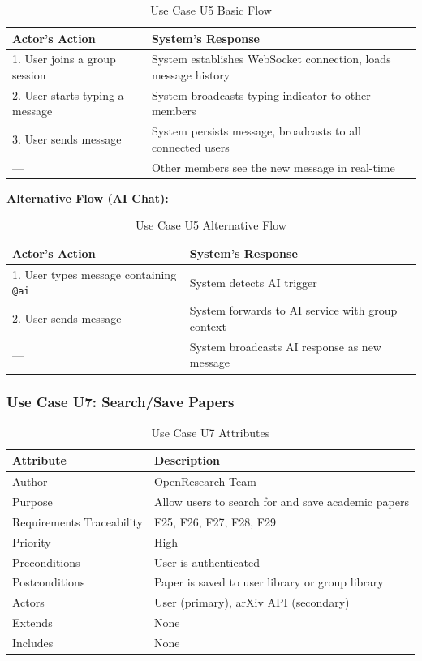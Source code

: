 \documentclass[11pt,a4paper]{article}
\begin{document}
\begin{table}[H]
\centering
\begin{tabular}{p{6cm}p{7cm}}
\toprule
\textbf{Actor's Action} & \textbf{System's Response} \\
\midrule
1. User joins a group session & System establishes WebSocket connection, loads message history \\
2. User starts typing a message & System broadcasts typing indicator to other members \\
3. User sends message & System persists message, broadcasts to all connected users \\
--- & Other members see the new message in real-time \\
\bottomrule
\end{tabular}
\caption{Use Case U5 Basic Flow}
\end{table}

\textbf{Alternative Flow (AI Chat):}

\begin{table}[H]
\centering
\begin{tabular}{p{6cm}p{7cm}}
\toprule
\textbf{Actor's Action} & \textbf{System's Response} \\
\midrule
1. User types message containing \texttt{@ai} & System detects AI trigger \\
2. User sends message & System forwards to AI service with group context \\
--- & System broadcasts AI response as new message \\
\bottomrule
\end{tabular}
\caption{Use Case U5 Alternative Flow}
\end{table}

\subsubsection{Use Case U7: Search/Save Papers}

\begin{table}[H]
\centering
\begin{tabular}{p{4cm}p{9cm}}
\toprule
\textbf{Attribute} & \textbf{Description} \\
\midrule
Author & OpenResearch Team \\
Purpose & Allow users to search for and save academic papers \\
Requirements Traceability & F25, F26, F27, F28, F29 \\
Priority & High \\
Preconditions & User is authenticated \\
Postconditions & Paper is saved to user library or group library \\
Actors & User (primary), arXiv API (secondary) \\
Extends & None \\
Includes & None \\
\bottomrule
\end{tabular}
\caption{Use Case U7 Attributes}
\end{table}
\end{document}
